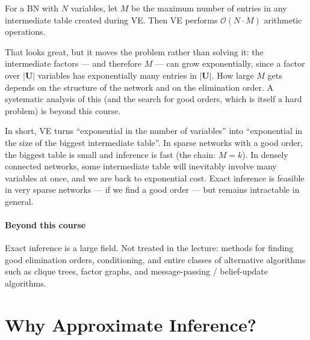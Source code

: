 \documentclass[11pt, oneside]{book}
\newcommand{\bigO}[1]{\mathcal{O}\!\left(#1\right)}
\let\originalsection\section
\renewcommand{\section}{\Needspace{7\baselineskip}\originalsection}
\begin{document}
\begin{thmbox}[title={Cost of variable elimination}, unbreakable]
For a BN with $N$ variables, let $M$ be the maximum number of entries in any
intermediate table created during VE. Then VE performs $\bigO{N \cdot M}$
arithmetic operations.
\end{thmbox}

That looks great, but it moves the problem rather than solving it: the
intermediate factors --- and therefore $M$ --- can grow exponentially, since
a factor over $|\mathbf{U}|$ variables has exponentially many entries in
$|\mathbf{U}|$. How large $M$ gets depends on the structure of the network and
on the elimination order. A systematic analysis of this (and the search for
good orders, which is itself a hard problem) is beyond this course.

In short, VE turns ``exponential in the number of variables'' into ``exponential in the
size of the biggest intermediate table''. In sparse networks with a good
order, the biggest table is small and inference is fast (the chain: $M = k$).
In densely connected networks, some intermediate table will inevitably
involve many variables at once, and we are back to exponential cost. Exact
inference is feasible in very sparse networks --- if we find a good order ---
but remains intractable in general.

\paragraph{Beyond this course} Exact inference is a large field. Not treated
in the lecture: methods for finding good elimination orders, conditioning,
and entire classes of alternative algorithms such as clique trees, factor
graphs, and message-passing / belief-update algorithms.

\section{Why Approximate Inference?}
\label{sec:why-approx}
\end{document}
